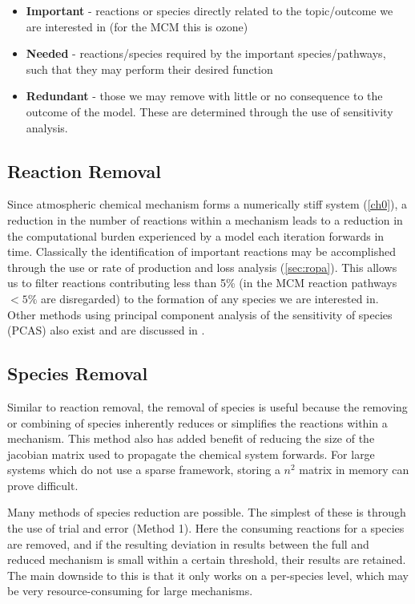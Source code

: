 \begin{itemize}
    \item \textbf{Important} - reactions or species directly related to the topic/outcome we are interested in (for the MCM this is ozone)
    \item \textbf{Needed} - reactions/species required by the important species/pathways, such that they may perform their desired function
    \item \textbf{Redundant} - those we may remove with little or no consequence to the outcome of the model. These are determined through the use of sensitivity analysis.
\end{itemize}



\subsection{Reaction Removal}
Since atmospheric chemical mechanism forms a numerically stiff system (\autoref{ch0}), a reduction in the number of reactions within a mechanism leads to a reduction in the computational burden experienced by a model each iteration forwards in time. Classically the identification of important reactions may be accomplished through the use or rate of production and loss analysis (\autoref{sec:ropa}). This allows us to filter reactions contributing less than 5\% (in the MCM reaction pathways $<5\%$ are disregarded) to the formation of any species we are interested in. Other methods using principal component analysis of the sensitivity of species (PCAS) also exist and are discussed in \citep{PCAS,wyche}.


\subsection{Species Removal}
Similar to reaction removal, the removal of species is useful because the removing or combining of species inherently reduces or simplifies the reactions within a mechanism.  This method also has added benefit of reducing the size of the jacobian matrix used to propagate the chemical system forwards. For large systems which do not use a sparse framework, storing a $n^2$ matrix in memory can prove difficult.

Many methods of species reduction are possible. The simplest of these is through the use of trial and error \citep{tur1990} (Method 1). Here the consuming reactions for a species are removed, and if the resulting deviation in results between the full and reduced mechanism is small within a certain threshold, their results are retained. The main downside to this is that it only works on a per-species level, which may be very resource-consuming for large mechanisms.


